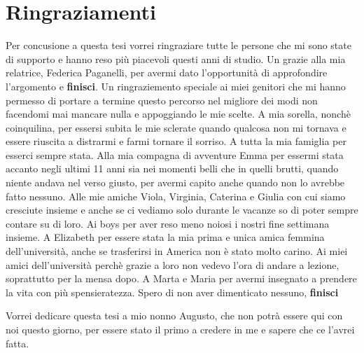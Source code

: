 \chapter{Ringraziamenti}
Per concusione a questa tesi vorrei ringraziare tutte le persone che mi sono state di supporto e 
hanno reso più piacevoli questi anni di studio.
\newline Un grazie alla mia relatrice, Federica Paganelli, per avermi dato l'opportunità di approfondire  
l'argomento e \textbf{finisci}.
\newline Un ringraziemento speciale ai miei genitori che mi hanno permesso di portare a termine questo percorso nel migliore 
dei modi non facendomi mai mancare nulla e appoggiando le mie scelte.
\newline A mia sorella, nonchè coinquilina, per essersi subita le mie sclerate quando qualcosa non mi tornava e essere riuscita a distrarmi e farmi
tornare il sorriso.
\newline A tutta la mia famiglia per esserci sempre stata.
\newline Alla mia compagna di avventure Emma per essermi stata accanto negli ultimi 11 anni sia nei momenti belli 
che in quelli brutti, quando niente andava nel verso giusto,
per avermi capito anche quando non lo avrebbe fatto nessuno.
\newline Alle mie amiche Viola, Virginia, Caterina e Giulia con cui siamo cresciute insieme e anche se ci vediamo solo 
durante le vacanze so di poter sempre contare su di loro.
\newline Ai boys per aver reso meno noiosi i nostri fine settimana insieme.
\newline A Elizabeth per essere stata la mia prima e unica amica femmina dell'università, 
anche se trasferirsi in America non è stato molto carino.
\newline Ai miei amici dell'università perchè grazie a loro non vedevo l'ora di andare a lezione, soprattutto per la mensa dopo.
\newline A Marta e Maria per avermi insegnato a prendere la vita con più spensieratezza.
\newline Spero di non aver dimenticato nessuno, \textbf{finisci}


Vorrei dedicare questa tesi a mio nonno Augusto, che non potrà essere qui con noi questo giorno,
per essere stato il primo a credere in me e sapere che ce l'avrei fatta.